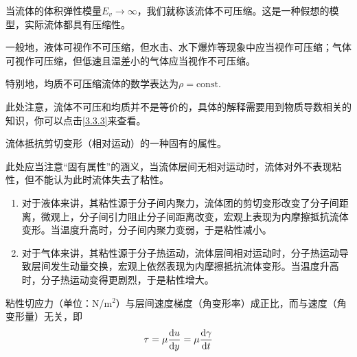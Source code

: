 
\begin{definition}[不可压缩流体]
	当流体的体积弹性模量$E_v \to \infty$，我们就称该流体不可压缩。这是一种假想的模型，实际流体都具有压缩性。
\end{definition}

一般地，液体可视作不可压缩，但水击、水下爆炸等现象中应当视作可压缩；气体可视作可压缩，但低速且温差小的气体应当视作不可压缩。

特别地，均质不可压缩流体的数学表达为$\rho = \text{const}$. 

\begin{tip}
	此处注意，流体不可压和均质并不是等价的，具体的解释需要用到物质导数相关的知识，你可以点击\ref{3.3.3}来查看。
\end{tip}



\begin{definition}[粘性]
	流体抵抗剪切变形（相对运动）的一种固有的属性。
\end{definition}

\begin{tip}
	此处应当注意“固有属性”的涵义，当流体层间无相对运动时，流体对外不表现粘性，但不能认为此时流体失去了粘性。
\end{tip}


\begin{enumerate}
	\item 对于液体来讲，其粘性源于分子间内聚力，流体团的剪切变形改变了分子间距离，微观上，分子间引力阻止分子间距离改变，宏观上表现为内摩擦抵抗流体变形。当温度升高时，分子间内聚力变弱，于是粘性减小。
	\item 对于气体来讲，其粘性源于分子热运动，流体层间相对运动时，分子热运动导致层间发生动量交换，宏观上依然表现为内摩擦抵抗流体变形。当温度升高时，分子热运动变得更剧烈，于是粘性增大。
\end{enumerate}


\begin{definition}
	粘性切应力（单位：N/m$^2$）与层间速度梯度（角变形率）成正比，而与速度（角变形量）无关，即
	\begin{equation}
		\tau = \mu \dv{u}{y} = \mu \dv{\gamma}{t}
	\end{equation}
\end{definition}

